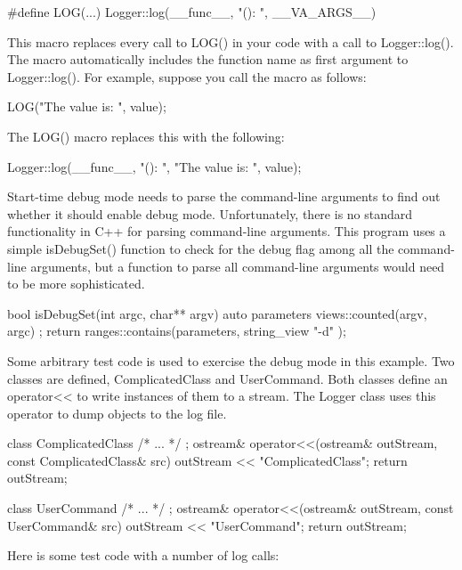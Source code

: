 \begin{cpp}
#define LOG(...) Logger::log(__func__, "(): ", __VA_ARGS__)
\end{cpp}

This macro replaces every call to LOG() in your code with a call to Logger::log(). The macro automatically includes the function name as first argument to Logger::log(). For example, suppose you call the macro as follows:

\begin{cpp}
LOG("The value is: ", value);
\end{cpp}

The LOG() macro replaces this with the following:

\begin{cpp}
Logger::log(__func__, "(): ", "The value is: ", value);
\end{cpp}

Start-time debug mode needs to parse the command-line arguments to find out whether it should enable debug mode. Unfortunately, there is no standard functionality in C++ for parsing command-line arguments. This program uses a simple isDebugSet() function to check for the debug flag among all the command-line arguments, but a function to parse all command-line arguments would need to be more sophisticated.

\begin{cpp}
bool isDebugSet(int argc, char** argv)
{
    auto parameters { views::counted(argv, argc) };
    return ranges::contains(parameters, string_view { "-d" });
}
\end{cpp}

Some arbitrary test code is used to exercise the debug mode in this example. Two classes are defined, ComplicatedClass and UserCommand. Both classes define an operator<{}< to write instances of them to a stream. The Logger class uses this operator to dump objects to the log file.

\begin{cpp}
class ComplicatedClass { /* ... */ };
ostream& operator<<(ostream& outStream, const ComplicatedClass& src)
{
    outStream << "ComplicatedClass";
    return outStream;
}

class UserCommand { /* ... */ };
ostream& operator<<(ostream& outStream, const UserCommand& src)
{
    outStream << "UserCommand";
    return outStream;
}
\end{cpp}

Here is some test code with a number of log calls:


